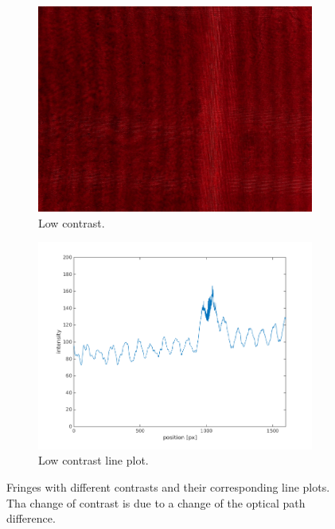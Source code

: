 \documentclass[a4paper, 12pt]{paper}
\begin{document}
\begin{figure}[H]
\begin{subfigure}[t]{0.40\textwidth}
        \includegraphics[width=\textwidth]{img/197}
        \caption{Low contrast.}
    \end{subfigure}
    \begin{subfigure}[t]{0.45\textwidth}
        \includegraphics[width=\textwidth]{img/low_contrast_line}
        \caption{Low contrast line plot.}
    \end{subfigure}
    \caption{Fringes with different contrasts and their corresponding line plots. Tha change of contrast is due to a change of the optical path difference.}
\label{fig:contrast}
\end{figure}
\end{document}
